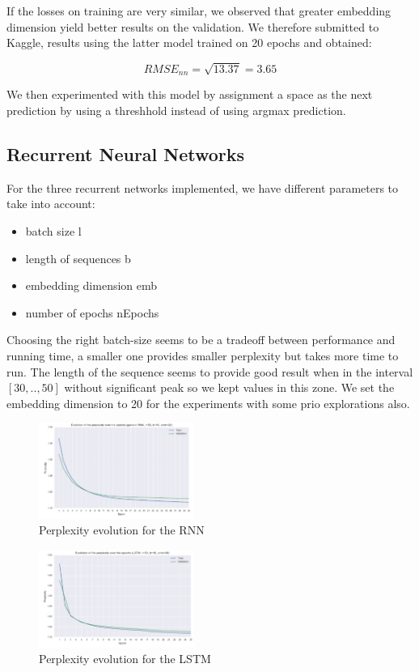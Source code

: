 \documentclass[11pt]{article}
\begin{document}
If the losses on training are very similar, we observed that greater embedding dimension yield better results on the validation. We therefore submitted to Kaggle, results using the latter model trained on 20 epochs and obtained:

$$RMSE_{nn} = \sqrt{13.37} = 3.65$$

We then experimented with this model by assignment a space as the next prediction by using a threshhold instead of using argmax prediction.


\subsection{Recurrent Neural Networks}

For the three recurrent networks implemented, we have different parameters to take into account: 
\begin{itemize}
	\item batch size l
	\item length of sequences b
	\item embedding dimension emb
	\item number of epochs nEpochs
\end{itemize}

Choosing the right batch-size seems to be a tradeoff between performance and running time, a smaller one provides smaller perplexity but takes more time to run. The length of the sequence seems to provide good result when in the interval $[30,..,50]$ without significant peak so we kept values in this zone. We set the embedding dimension to 20 for the experiments with some prio explorations also.


\begin{figure}[H]
\begin{center}
    \includegraphics[width=0.45\textwidth]{perp_rnn.png}
    \caption{Perplexity evolution for the RNN}
\end{center}
\end{figure}

\begin{figure}[H]
\begin{center}
    \includegraphics[width=0.45\textwidth]{perp_lstm.png}
    \caption{Perplexity evolution for the LSTM}
\end{center}
\end{figure}
\end{document}
